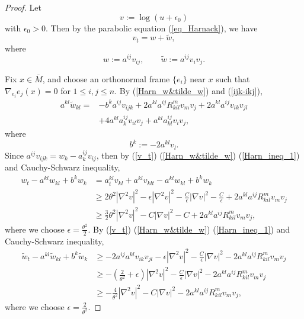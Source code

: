 \documentclass[12pt]{amsart}
\theoremstyle{definition}
\theoremstyle{remark}
\numberwithin{equation}{section}
\begin{document}
\begin{proof}
	Let $$v:= \log (u + \epsilon_0)$$ with $\epsilon_0 > 0$. Then by the parabolic equation (\ref{eq_Harnack}), we have
	\begin{equation}\label{v_t}
	v_t = w + \tilde{w},
	\end{equation}
	where 
	\begin{equation}\label{Harn_w&tilde_w}
	w := a^{ij}v_{ij}, \qquad \tilde{w} := a^{ij} v_i v_j.
	\end{equation}
	
	
	Fix $x \in \overline{M}$, and choose an orthonormal frame $\{e_i\}$ near $x$ such that $\nabla_{e_i}e_j (x) = 0$ for $1 \leq i, j \leq n$.
	By (\ref{Harn_w&tilde_w}) and (\ref{ijk-ikj}),
	\begin{equation}\label{Harn_ineq_1}
	\begin{aligned}
	a^{kl} \tilde{w}_{kl}
	=& - b^k a^{ij} v_{ijk} + 2 a^{kl} a^{ij} R^m_{kil} v_m v_j + 2 a^{kl} a^{ij} v_{ik} v_{jl} \\
	&+ 4 a^{kl} a^{ij}_k v_{il} v_j + a^{kl} a^{ij}_{kl} v_i v_j,
	\end{aligned}	
	\end{equation}
	where
	\begin{equation}\label{Harn_ineq_2}
	b^k := -2 a^{kl} v_l.
	\end{equation}
	Since $a^{ij}v_{ijk} = w_k - a^{ij}_k v_{ij}$, then
	by (\ref{v_t}) (\ref{Harn_w&tilde_w}) (\ref{Harn_ineq_1}) and Cauchy-Schwarz inequality,
	\begin{equation}\label{w_t-Lw}
	\begin{aligned}
	w_t - a^{kl} w_{kl} + b^k w_k &= a^{kl}_t v_{kl} + a^{kl} v_{klt} - a^{kl} w_{kl} + b^k w_k \\
	&\geq 2\theta^2 |\nabla^2 v|^2 - \epsilon|\nabla^2 v|^2 - \frac{C}{\epsilon} |\nabla v|^2 - \frac{C}{\epsilon} + 2 a^{kl} a^{ij} R^m_{kil} v_m v_j\\
	&\geq \frac{3}{2}\theta^2 |\nabla^2 v|^2 - C |\nabla v|^2 - C + 2 a^{kl} a^{ij} R^m_{kil} v_m v_j,
	\end{aligned}
	\end{equation}
	where we choose $\epsilon = \frac{ \theta^2}{2}$.
	By (\ref{v_t}) (\ref{Harn_w&tilde_w}) (\ref{Harn_ineq_1}) and Cauchy-Schwarz inequality,
	\begin{equation}\label{tilde_w_t-Lw}
	\begin{aligned}
	\tilde{w}_t - a^{kl} \tilde{w}_{kl} + b^k \tilde{w}_k 
	&\geq - 2 a^{ij} a^{kl} v_{ik} v_{jl} - \epsilon |\nabla^2 v|^2 - \frac{C}{\epsilon} |\nabla v|^2 - 2 a^{kl} a^{ij} R^m_{kil} v_m v_j\\
	&\geq - (\frac{2}{\theta^2} + \epsilon) |\nabla^2 v|^2 - \frac{C}{\epsilon} |\nabla v|^2 - 2 a^{kl} a^{ij} R^m_{kil} v_m v_j\\
	&\geq - \frac{4}{\theta^2} |\nabla^2 v|^2 - C |\nabla v|^2 - 2 a^{kl} a^{ij} R^m_{kil} v_m v_j,
	\end{aligned}
	\end{equation}
	where we choose $\epsilon = \frac{2}{\theta^2}$.
	

\end{proof}
\end{document}
